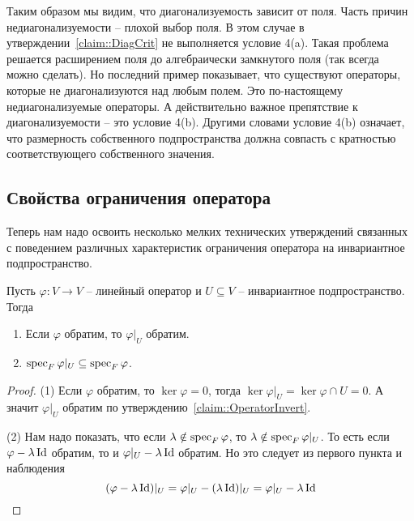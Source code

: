 Таким образом мы видим, что диагонализуемость зависит от поля.
Часть причин недиагонализуемости -- плохой выбор поля.
В этом случае в утверждении~\ref{claim::DiagCrit} не выполняется условие 4(a).
Такая проблема решается расширением поля до алгебраически замкнутого поля (так всегда можно сделать).
Но последний пример показывает, что существуют операторы, которые не диагонализуются над любым полем.
Это по-настоящему недиагонализуемые операторы.
А действительно важное препятствие к диагонализуемости -- это условие 4(b).
Другими словами условие 4(b) означает, что размерность собственного подпространства должна совпасть с кратностью соответствующего собственного значения.


\subsection{Свойства ограничения оператора}

Теперь нам надо освоить несколько мелких технических утверждений связанных с поведением различных характеристик ограничения оператора на инвариантное подпространство.

\begin{claim}
Пусть $\varphi\colon V\to V$ -- линейный оператор и $U\subseteq V$ -- инвариантное подпространство.
Тогда
\begin{enumerate}
\item Если $\varphi$ обратим, то $\varphi|_U$ обратим.

\item $\operatorname{spec}_F \varphi|_U\subseteq \operatorname{spec}_F \varphi$.
\end{enumerate}
\end{claim}
\begin{proof}
(1) Если $\varphi$ обратим, то $\ker \varphi = 0$, тогда $\ker \varphi|_U = \ker \varphi \cap U = 0$.
А значит $\varphi|_U$ обратим по утверждению~\ref{claim::OperatorInvert}.

(2) Нам надо показать, что если $\lambda\notin\operatorname{spec}_F \varphi$, то $\lambda\notin\operatorname{spec}_F \varphi|_U$.
То есть если $\varphi-\lambda\operatorname{Id}$ обратим, то и $\varphi|_U-\lambda \operatorname{Id}$ обратим.
Но это следует из первого пункта и наблюдения 
\[
(\varphi - \lambda \operatorname{Id})|_U = \varphi|_U -(\lambda\operatorname{Id})|_U = \varphi|_U - \lambda \operatorname{Id}
\]
\end{proof}



